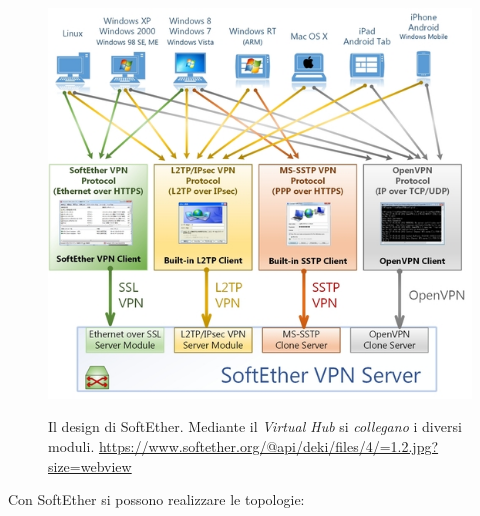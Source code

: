 \begin{figure}
  \includegraphics[scale=0.45]{img/softether_scheme}
  \label{fig:softether-archi}
  \caption[Il design di SoftEther]{Il design di SoftEther. Mediante il \textit{Virtual Hub} si \textit{collegano} i diversi
  moduli. \url{https://www.softether.org/@api/deki/files/4/=1.2.jpg?size=webview}}
\end{figure}
Con SoftEther si possono realizzare le topologie:
